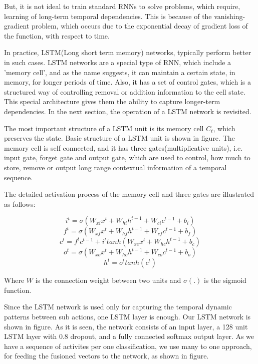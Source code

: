 But, it is not ideal to train standard RNNs to solve problems,
which require, learning of long-term temporal dependencies. This is because of the vanishing-gradient problem, which occurs
due to the exponential decay of gradient loss of the function, with respect to time. 

In practice, LSTM(Long short term memory) networks, typically perform better in such cases.
LSTM networks are a special type of RNN, which include a 'memory cell', and as the name suggests,
it can maintain a certain state, in memory, for longer periods of time. 
Also, it has a set of control gates, which is a structured way of controlling removal or addition information to the cell state.
This special architecture gives them the ability to capture longer-term dependencies. In the next section, the operation of a LSTM
network is revisited.

The most important structure of a LSTM unit is its memory cell $C_{t}$, which preserves the state. Basic structure of a LSTM
unit is shown in figure. The memory cell is self connected, and it has three gates(multiplicative units), i.e. input gate, forget gate and 
output gate, which are used to control, how much to store, remove or output long range contextual information of a temporal sequence.

The detailed activation process of the memory cell and three gates are
illustrated as follows:

\begin{equation}
i^{t} = \sigma (W_{xi}x^t + W_{hi}h^{t-1} + W_{ci}c^{t-1} + b_{i})
\end{equation}
\begin{equation}
f^{t} = \sigma (W_{xf}x^t + W_{hf}h^{t-1} + W_{cf}c^{t-1} + b_{f})
\end{equation}
\begin{equation}
c^{t} = f^tc^{t-1} + i^ttanh(W_{xc}x^t + W_{hc}h^{t-1} + b_{c})
\end{equation}
\begin{equation}
o^{t} = \sigma (W_{xo}x^t + W_{ho}h^{t-1} + W_{co}c^{t-1} + b_{o})
\end{equation}
\begin{equation}
h^t = o^ttanh(c^t)
\end{equation}

Where $W$ is the connection weight between two units and $\sigma(.)$ is the sigmoid function.

Since the LSTM network is used only for capturing the temporal dynamic patterns between sub actions, one LSTM layer is enough.
Our LSTM network is shown in figure. As it is seen, the network consists of an input layer, a 128 unit LSTM layer with 0.8 dropout, and
a fully connected softmax output layer. As we have a sequence of activites per one classification, we use many to one approach,
for feeding the fusioned vectors to the network, as shown in figure. 




